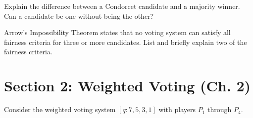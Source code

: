 \documentclass[12pt]{exam}
\begin{document}
\begin{questions}
\newpage
\question[4] Explain the difference between a Condorcet candidate and a majority winner. Can a candidate be one without being the other?

\vspace{9cm}

\question[4] Arrow’s Impossibility Theorem states that no voting system can satisfy all fairness criteria for three or more candidates. List and briefly explain two of the fairness criteria.
\vfill
\newpage
\section*{Section 2: Weighted Voting (Ch. 2)}

\question[10] Consider the weighted voting system $[q : 7, 5, 3, 1]$ with players $P_1$ through $P_4$.

\end{questions}
\end{document}
